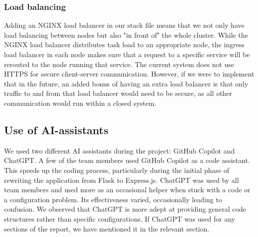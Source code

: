 \subsubsection{Load balancing}
Adding an NGINX load balancer in our stack file means that we not only have load balancing between nodes but also "in front of" the whole cluster. While the NGINX load balancer distributes task load to an appropriate node, the ingress load balancer in each node makes sure that a request to a specific service will be rerouted to the node running that service. The current system does not use HTTPS for secure client-server communication. However, if we were to implement that in the future, an added bonus of having an extra load balancer is that only traffic to and from that load balancer would need to be secure, as all other communication would run within a closed system. 

\subsection{Use of AI-assistants}
We used two different AI assistants during the project: GitHub Copilot and ChatGPT. A few of the team members used GitHub Copilot as a code assistant. This speeds up the coding process, particularly during the initial phase of rewriting the application from Flask to Express.js. ChatGPT was used by all team members and used more as an occasional helper when stuck with a code or a configuration problem. Its effectiveness varied, occasionally leading to confusion. We observed that ChatGPT is more adept at providing general code structures rather than specific configurations. If ChatGPT was used for any sections of the report, we have mentioned it in the relevant section. 

